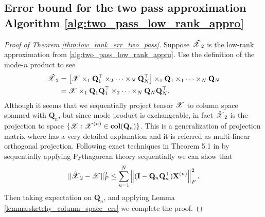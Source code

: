 \subsection{Error bound for the two pass approximation Algorithm \ref{alg:two_pass_low_rank_appro}}
\begin{proof}[Proof of Theorem \ref{thm:low_rank_err_two_pass}]
Suppose $\T{\hat{X}}_2$ is the low-rank approximation from \ref{alg:two_pass_low_rank_appro}.
Use the definition of the mode-$n$ product to see
\begin{equation*}
\begin{aligned}
\T{\hat{X}}_2 &=  \left[\T{X}\times_1 \mathbf{Q}_1^\top \times_2 \cdots \times_N \mathbf{Q}_N^\top\right] \times_1 \mathbf{Q}_1\times_1 \cdots\times_N \mathbf{Q}_N\\
&= \T{X}\times_1 \mathbf{Q}_1\mathbf{Q}_1^\top \times_2 \cdots \times_N \mathbf{Q}_N\mathbf{Q}_N^\top.
\end{aligned}
\end{equation*}
Although it seems that we sequentially project tensor $\T{X}$ to column space spanned with $\mathbf{Q}_n$, but since mode product is exchangeable, in fact $\hat{\T{X}}_2$ is the projection to space $\{ \T{X} : \T{X}^{(n)} 
\in \mathbf{col}(\mathbf{Q}_n) \}$.  This is a generalization of projection matrix where \cite{de2008tensor} has a very detailed  explanation and it is referred as multi-linear orthogonal projection.  Following exact techniques in Theorem 5.1 in \cite{vannieuwenhoven2012new} by sequentially applying Pythagorean theory sequentially we can show that 
\begin{equation}
\|\hat{\T{X}}_2 - \T{X}\|_F^2 \le \sum_{n=1}^N  \left \| (\mathbf{I} - \mathbf{Q}_n\mathbf{Q}_n^\top) \mathbf{X}^{(n)} \right\|_F^2 .
\end{equation}
Then taking expectation on $\mathbf{Q}_n$, and applying Lemma \ref{lemma:sketchy_column_space_err} we complete the proof. 




\end{proof}

